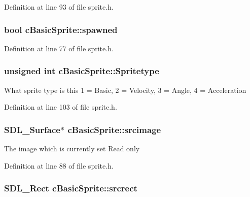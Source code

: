 Definition at line 93 of file sprite.\-h.

\hypertarget{classc_basic_sprite_ae82550ad1ec25aaf8b61e78afb3abc9d}{
\subsubsection[{spawned}]{\setlength{\rightskip}{0pt plus 5cm}bool c\-Basic\-Sprite\-::spawned}}\label{classc_basic_sprite_ae82550ad1ec25aaf8b61e78afb3abc9d}


Definition at line 77 of file sprite.\-h.

\hypertarget{classc_basic_sprite_a7bf47e784956a031db06a3f768b688f4}{
\subsubsection[{Spritetype}]{\setlength{\rightskip}{0pt plus 5cm}unsigned int c\-Basic\-Sprite\-::\-Spritetype}}\label{classc_basic_sprite_a7bf47e784956a031db06a3f768b688f4}
What sprite type is this 1 = Basic, 2 = Velocity, 3 = Angle, 4 = Acceleration 

Definition at line 103 of file sprite.\-h.

\hypertarget{classc_basic_sprite_afd756d967421277013a3af729860d434}{
\subsubsection[{srcimage}]{\setlength{\rightskip}{0pt plus 5cm}S\-D\-L\-\_\-\-Surface$\ast$ c\-Basic\-Sprite\-::srcimage}}\label{classc_basic_sprite_afd756d967421277013a3af729860d434}
The image which is currently set Read only 

Definition at line 88 of file sprite.\-h.

\hypertarget{classc_basic_sprite_a595a3142b6008d8484a91c44ea5f0e8f}{
\subsubsection[{srcrect}]{\setlength{\rightskip}{0pt plus 5cm}S\-D\-L\-\_\-\-Rect c\-Basic\-Sprite\-::srcrect}}\label{classc_basic_sprite_a595a3142b6008d8484a91c44ea5f0e8f}



